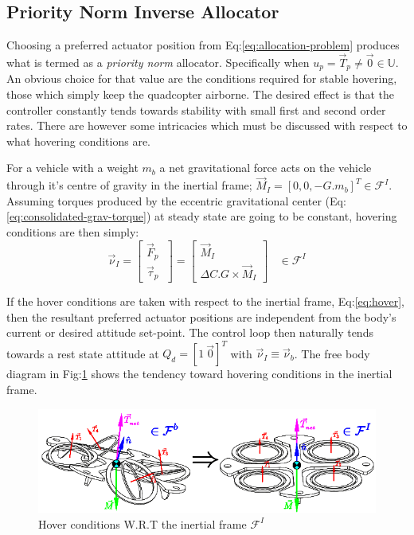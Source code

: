 \subsection{Priority Norm Inverse Allocator}
\label{subsec:allocation.allocators.norminverse}
Choosing a preferred actuator position from Eq:\ref{eq:allocation-problem} produces what is termed as a \emph{priority norm} allocator. Specifically when $u_p=\vec{T}_p\not=\vec{0}\in\mathbb{U}$. An obvious choice for that value are the conditions required for stable hovering, those which simply keep the quadcopter airborne. The desired effect is that the controller constantly tends towards stability with small first and second order rates. There are however some intricacies which must be discussed with respect to what hovering conditions are.
\par
For a vehicle with a weight $m_b$ a net gravitational force acts on the vehicle through it's centre of gravity in the inertial frame; $\vec{M}_I=[0, 0, -G.m_b]^T\in\mathcal{F}^I$. Assuming torques produced by the eccentric gravitational center (Eq:\ref{eq:consolidated-grav-torque}) at steady state are going to be constant, hovering conditions are then simply:
\begin{equation}\label{eq:hover}
\vec{\nu}_I=
\begin{bmatrix}
\vec{F}_p\hspace{3pt}\\
\vec{\tau}_p\hspace{3pt}
\end{bmatrix}
=
\begin{bmatrix}
\vec{M}_I\hspace{3pt}\\
\Delta C.G \times \vec{M}_I
\end{bmatrix}~~~~\in\mathcal{F}^I
\end{equation}
\par
If the hover conditions are taken with respect to the inertial frame, Eq:\ref{eq:hover}, then the resultant preferred actuator positions are independent from the body's current or desired attitude set-point. The control loop then naturally tends towards a rest state attitude at $Q_d=[1~\vec{0}]^T$ with $\vec{\nu}_I\equiv\vec{\nu}_b$. The free body diagram in Fig:\ref{fig:hover-inertial} shows the tendency toward hovering conditions in the inertial frame.
\begin{figure}[htbp]
\centering
\includegraphics[width=\textwidth]{figs/hover-inertial}
\caption{Hover conditions W.R.T the inertial frame $\mathcal{F}^I$}
\label{fig:hover-inertial}
\vspace{-20pt}
\end{figure}
